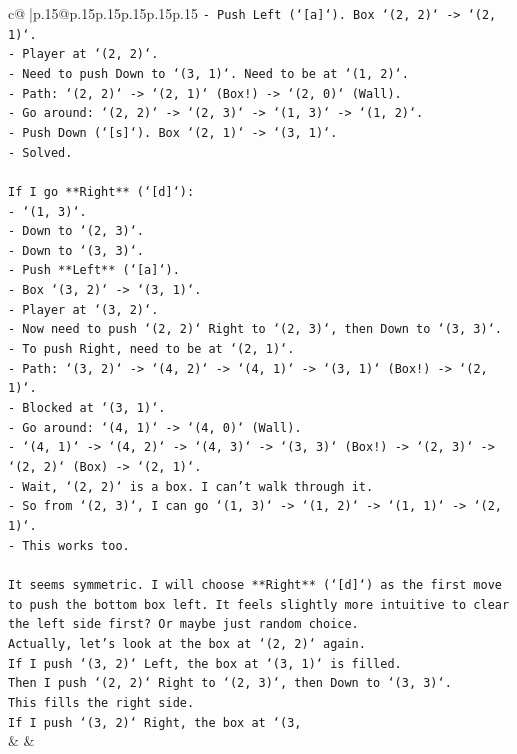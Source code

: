 \documentclass{article}
\begin{document}
{\begin{supertabular}{c@{$\;$}|p{.15\linewidth}@{}p{.15\linewidth}p{.15\linewidth}p{.15\linewidth}p{.15\linewidth}p{.15\linewidth}}
{{{\texttt{{-} Push Left (`{[}a{]}`). Box `(2, 2)` {-}> `(2, 1)`.} \\
\texttt{{-} Player at `(2, 2)`.} \\
\texttt{{-} Need to push Down to `(3, 1)`. Need to be at `(1, 2)`.} \\
\texttt{{-} Path: `(2, 2)` {-}> `(2, 1)` (Box!) {-}> `(2, 0)` (Wall).} \\
\texttt{{-} Go around: `(2, 2)` {-}> `(2, 3)` {-}> `(1, 3)` {-}> `(1, 2)`.} \\
\texttt{{-} Push Down (`{[}s{]}`). Box `(2, 1)` {-}> `(3, 1)`.} \\
\texttt{{-} Solved.} \\
\\ 
\texttt{If I go **Right** (`{[}d{]}`):} \\
\texttt{{-} `(1, 3)`.} \\
\texttt{{-} Down to `(2, 3)`.} \\
\texttt{{-} Down to `(3, 3)`.} \\
\texttt{{-} Push **Left** (`{[}a{]}`).} \\
\texttt{{-} Box `(3, 2)` {-}> `(3, 1)`.} \\
\texttt{{-} Player at `(3, 2)`.} \\
\texttt{{-} Now need to push `(2, 2)` Right to `(2, 3)`, then Down to `(3, 3)`.} \\
\texttt{{-} To push Right, need to be at `(2, 1)`.} \\
\texttt{{-} Path: `(3, 2)` {-}> `(4, 2)` {-}> `(4, 1)` {-}> `(3, 1)` (Box!) {-}> `(2, 1)`.} \\
\texttt{{-} Blocked at `(3, 1)`.} \\
\texttt{{-} Go around: `(4, 1)` {-}> `(4, 0)` (Wall).} \\
\texttt{{-} `(4, 1)` {-}> `(4, 2)` {-}> `(4, 3)` {-}> `(3, 3)` (Box!) {-}> `(2, 3)` {-}> `(2, 2)` (Box) {-}> `(2, 1)`.} \\
\texttt{{-} Wait, `(2, 2)` is a box. I can't walk through it.} \\
\texttt{{-} So from `(2, 3)`, I can go `(1, 3)` {-}> `(1, 2)` {-}> `(1, 1)` {-}> `(2, 1)`.} \\
\texttt{{-} This works too.} \\
\\ 
\texttt{It seems symmetric. I will choose **Right** (`{[}d{]}`) as the first move to push the bottom box left. It feels slightly more intuitive to clear the left side first? Or maybe just random choice.} \\
\texttt{Actually, let's look at the box at `(2, 2)` again.} \\
\texttt{If I push `(3, 2)` Left, the box at `(3, 1)` is filled.} \\
\texttt{Then I push `(2, 2)` Right to `(2, 3)`, then Down to `(3, 3)`.} \\
\texttt{This fills the right side.} \\
\texttt{If I push `(3, 2)` Right, the box at `(3,} \\
            }
        }
    }
    & & \\ \\


\end{supertabular}}
\end{document}
